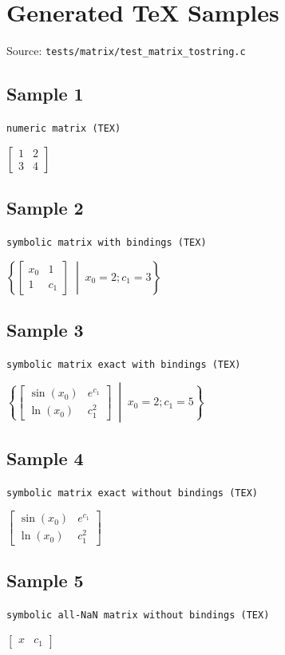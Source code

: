 \documentclass{article}
\begin{document}
\section*{Generated TeX Samples}
\noindent Source: \texttt{tests/matrix/test\_matrix\_tostring.c}

\subsection*{Sample 1}
\noindent\texttt{numeric matrix (TEX)}
\begin{flushleft}
$\displaystyle \begin{bmatrix}1 & 2 \\[10pt] 3 & 4\end{bmatrix}$
\end{flushleft}

\subsection*{Sample 2}
\noindent\texttt{symbolic matrix with bindings (TEX)}
\begin{flushleft}
$\displaystyle \left\{ \begin{bmatrix}x_{0} & 1 \\[10pt] 1 & c_{1}\end{bmatrix} \;\middle|\; x_{0} = 2; c_{1} = 3 \right\}$
\end{flushleft}

\subsection*{Sample 3}
\noindent\texttt{symbolic matrix exact with bindings (TEX)}
\begin{flushleft}
$\displaystyle \left\{ \begin{bmatrix}\sin(x_{0}) & e^{c_{1}} \\[10pt] \ln(x_{0}) & c_{1}^{2}\end{bmatrix} \;\middle|\; x_{0} = 2; c_{1} = 5 \right\}$
\end{flushleft}

\subsection*{Sample 4}
\noindent\texttt{symbolic matrix exact without bindings (TEX)}
\begin{flushleft}
$\displaystyle \begin{bmatrix}\sin(x_{0}) & e^{c_{1}} \\[10pt] \ln(x_{0}) & c_{1}^{2}\end{bmatrix}$
\end{flushleft}

\subsection*{Sample 5}
\noindent\texttt{symbolic all-NaN matrix without bindings (TEX)}
\begin{flushleft}
$\displaystyle \begin{bmatrix}x & c_{1}\end{bmatrix}$
\end{flushleft}
\end{document}

